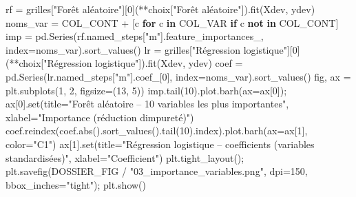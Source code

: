 \documentclass[
  10pt,
]{article}
\newenvironment{Shaded}{}{}
\newcommand{\BuiltInTok}[1]{\textcolor[rgb]{0.00,0.50,0.00}{#1}}
\newcommand{\ControlFlowTok}[1]{\textcolor[rgb]{0.00,0.44,0.13}{\textbf{#1}}}
\newcommand{\DecValTok}[1]{\textcolor[rgb]{0.25,0.63,0.44}{#1}}
\newcommand{\KeywordTok}[1]{\textcolor[rgb]{0.00,0.44,0.13}{\textbf{#1}}}
\newcommand{\NormalTok}[1]{#1}
\newcommand{\OperatorTok}[1]{\textcolor[rgb]{0.40,0.40,0.40}{#1}}
\newcommand{\StringTok}[1]{\textcolor[rgb]{0.25,0.44,0.63}{#1}}
\begin{document}
\begin{Shaded}
\begin{Highlighting}[]
\NormalTok{rf }\OperatorTok{=}\NormalTok{ grilles[}\StringTok{"Forêt aléatoire"}\NormalTok{][}\DecValTok{0}\NormalTok{](}\OperatorTok{**}\NormalTok{choix[}\StringTok{"Forêt aléatoire"}\NormalTok{]).fit(Xdev, ydev)}
\NormalTok{noms\_var }\OperatorTok{=}\NormalTok{ COL\_CONT }\OperatorTok{+}\NormalTok{ [c }\ControlFlowTok{for}\NormalTok{ c }\KeywordTok{in}\NormalTok{ COL\_VAR }\ControlFlowTok{if}\NormalTok{ c }\KeywordTok{not} \KeywordTok{in}\NormalTok{ COL\_CONT]}
\NormalTok{imp }\OperatorTok{=}\NormalTok{ pd.Series(rf.named\_steps[}\StringTok{"m"}\NormalTok{].feature\_importances\_, index}\OperatorTok{=}\NormalTok{noms\_var).sort\_values()}
\NormalTok{lr }\OperatorTok{=}\NormalTok{ grilles[}\StringTok{"Régression logistique"}\NormalTok{][}\DecValTok{0}\NormalTok{](}\OperatorTok{**}\NormalTok{choix[}\StringTok{"Régression logistique"}\NormalTok{]).fit(Xdev, ydev)}
\NormalTok{coef }\OperatorTok{=}\NormalTok{ pd.Series(lr.named\_steps[}\StringTok{"m"}\NormalTok{].coef\_[}\DecValTok{0}\NormalTok{], index}\OperatorTok{=}\NormalTok{noms\_var).sort\_values()}
\NormalTok{fig, ax }\OperatorTok{=}\NormalTok{ plt.subplots(}\DecValTok{1}\NormalTok{, }\DecValTok{2}\NormalTok{, figsize}\OperatorTok{=}\NormalTok{(}\DecValTok{13}\NormalTok{, }\DecValTok{5}\NormalTok{))}
\NormalTok{imp.tail(}\DecValTok{10}\NormalTok{).plot.barh(ax}\OperatorTok{=}\NormalTok{ax[}\DecValTok{0}\NormalTok{])}\OperatorTok{;}\NormalTok{ ax[}\DecValTok{0}\NormalTok{].}\BuiltInTok{set}\NormalTok{(title}\OperatorTok{=}\StringTok{"Forêt aléatoire – 10 variables les plus importantes"}\NormalTok{, xlabel}\OperatorTok{=}\StringTok{"Importance (réduction d\textquotesingle{}impureté)"}\NormalTok{)}
\NormalTok{coef.reindex(coef.}\BuiltInTok{abs}\NormalTok{().sort\_values().tail(}\DecValTok{10}\NormalTok{).index).plot.barh(ax}\OperatorTok{=}\NormalTok{ax[}\DecValTok{1}\NormalTok{], color}\OperatorTok{=}\StringTok{"C1"}\NormalTok{)}
\NormalTok{ax[}\DecValTok{1}\NormalTok{].}\BuiltInTok{set}\NormalTok{(title}\OperatorTok{=}\StringTok{"Régression logistique – coefficients (variables standardisées)"}\NormalTok{, xlabel}\OperatorTok{=}\StringTok{"Coefficient"}\NormalTok{)}
\NormalTok{plt.tight\_layout()}\OperatorTok{;}\NormalTok{ plt.savefig(DOSSIER\_FIG }\OperatorTok{/} \StringTok{"03\_importance\_variables.png"}\NormalTok{, dpi}\OperatorTok{=}\DecValTok{150}\NormalTok{, bbox\_inches}\OperatorTok{=}\StringTok{"tight"}\NormalTok{)}\OperatorTok{;}\NormalTok{ plt.show()}
\end{Highlighting}
\end{Shaded}
\end{document}
